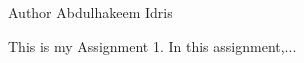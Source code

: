 \begin{DoxyAuthor}{Author}
Abdulhakeem Idris
\end{DoxyAuthor}
This is my Assignment 1. In this assignment,... 